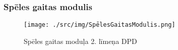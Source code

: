 \subsubsection{Spēles gaitas modulis}

\begin{figure}[htbp]
	\centering
	\texttt{[image: ./src/img/SpēlesGaitasModulis.png]}
	\caption{Spēles gaitas moduļa 2. līmeņa DPD}
	\label{fig:dpd-2-game-progress}
\end{figure}





